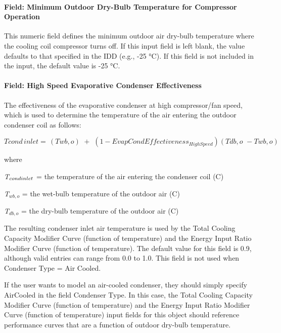 \paragraph{Field: Minimum Outdoor Dry-Bulb Temperature for Compressor Operation}

This numeric field defines the minimum outdoor air dry-bulb temperature where the cooling coil compressor turns off. If this input field is left blank, the value defaults to that specified in the IDD (e.g., -25 °C). If this field is not included in the input, the default value is -25 °C.

\paragraph{Field: High Speed Evaporative Condenser Effectiveness}\label{field-high-speed-evaporative-condenser-effectiveness}

The effectiveness of the evaporative condenser at high compressor/fan speed, which is used to determine the temperature of the air entering the outdoor condenser coil as follows:

\begin{equation}
Tcond\,inlet = \,\left( {Twb,o} \right)\,\, + \,\,\left( {1 - EvapCondEffectivenes{s_{HighSpeed}}} \right)\left( {Tdb,o\,\, - Twb,o} \right)
\end{equation}

where

\emph{T\(_{cond\\ inlet}\)} = the temperature of the air entering the condenser coil (C)

\emph{T\(_{wb,o}\)} = the wet-bulb temperature of the outdoor air (C)

\emph{T\(_{db,o}\)} = the dry-bulb temperature of the outdoor air (C)

The resulting condenser inlet air temperature is used by the Total Cooling Capacity Modifier Curve (function of temperature) and the Energy Input Ratio Modifier Curve (function of temperature). The default value for this field is 0.9, although valid entries can range from 0.0 to 1.0. This field is not used when Condenser Type = Air Cooled.

If the user wants to model an air-cooled condenser, they should simply specify AirCooled in the field Condenser Type. In this case, the Total Cooling Capacity Modifier Curve (function of temperature) and the Energy Input Ratio Modifier Curve (function of temperature) input fields for this object should reference performance curves that are a function of outdoor dry-bulb temperature.

